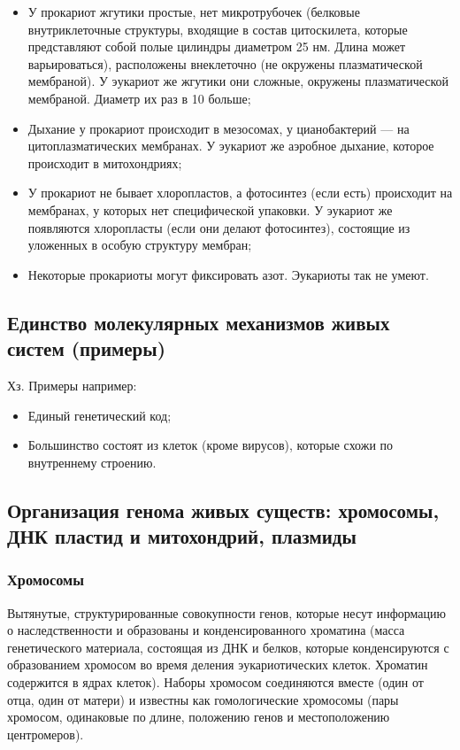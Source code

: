 \begin{itemize}
	\item У прокариот жгутики простые, нет микротрубочек (белковые внутриклеточные структуры, входящие в состав цитоскилета, которые представляют собой полые цилиндры диаметром 25 нм. Длина может варьироваться), расположены внеклеточно (не окружены плазматической мембраной). У эукариот же жгутики они сложные, окружены плазматической мембраной. Диаметр их раз в 10 больше;
	
	\item Дыхание у прокариот происходит в мезосомах, у цианобактерий --- на цитоплазматических мембранах. У эукариот же аэробное дыхание, которое происходит в митохондриях;
	
	\item У прокариот не бывает хлоропластов, а фотосинтез (если есть) происходит на мембранах, у которых нет специфической упаковки. У эукариот же появляются хлоропласты (если они делают фотосинтез), состоящие из уложенных в особую структуру мембран;
	
	\item Некоторые прокариоты могут фиксировать азот. Эукариоты так не умеют.
	
\end{itemize}


\subsection{Единство молекулярных механизмов живых систем (примеры)}

Хз. Примеры например:

\begin{itemize}
	\item Единый генетический код;
	
	\item Большинство состоят из клеток (кроме вирусов), которые схожи по внутреннему строению.
\end{itemize}

\subsection{Организация генома живых существ: хромосомы, ДНК пластид и митохондрий, плазмиды}

\subsubsection{Хромосомы}

Вытянутые, структурированные совокупности генов, которые несут информацию о наследственности и образованы и конденсированного хроматина (масса генетического материала, состоящая из ДНК и белков, которые конденсируются с образованием хромосом во время деления эукариотических клеток. Хроматин содержится в ядрах клеток). Наборы хромосом соединяются вместе (один от отца, один от матери) и известны как гомологические хромосомы (пары хромосом, одинаковые по длине, положению генов и местоположению центромеров).

